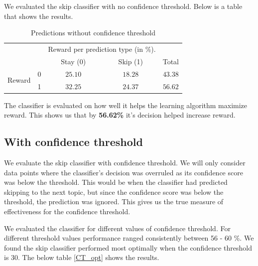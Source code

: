 We evaluated the skip classifier with no confidence threshold. Below is a table that shows the results. 

\begin{table}[h]
    \centering
    \begin{tabular}{l|l|c|c|c}
    \multicolumn{2}{c}{}&\multicolumn{2}{c}{Reward per prediction type (in \%).}&\\
    \cline{3-4}
    \multicolumn{2}{c|}{}&Stay (0) &Skip (1)&\multicolumn{1}{c}{Total}\\
    \cline{2-4}
    \multirow{2}{*}{Reward}& 0 & $25.10$ & $18.28$ & $43.38$\\
    \cline{2-4}
    & 1 & $32.25$ & $24.37$ & $56.62$\\
    \cline{2-4}
    \end{tabular}
    \caption{Predictions without confidence threshold}
\end{table}

The classifier is evaluated on how well it helps the learning algorithm maximize reward. This shows us that by \textbf{56.62\%} it's decision helped increase reward. \par 

\subsection{With confidence threshold}

We evaluate the skip classifier with confidence threshold. We will only consider data points where the classifier's decision was overruled as its confidence score was below the threshold. This would be when the classifier had predicted skipping to the next topic, but since the confidence score was below the threshold, the prediction was ignored. This gives us the true measure of effectiveness for the confidence threshold.\par  

We evaluated the classifier for different values of confidence threshold. For different threshold values performance ranged consistently between 56 - 60 \%. We found the skip classifier performed most optimally when the confidence threshold is 30. The below table \ref{CT_opt} shows the results. 


